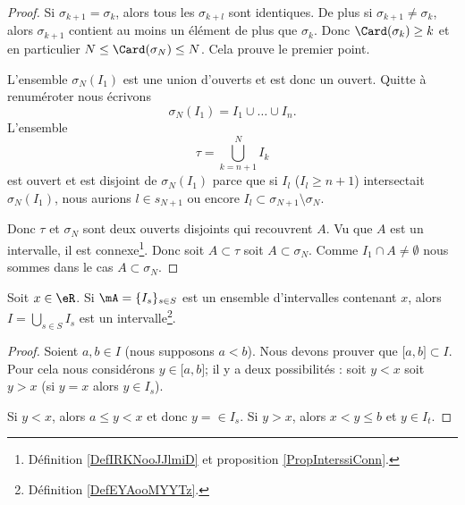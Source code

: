\begin{proof}
    Si \( \sigma_{k+1}=\sigma_k\), alors tous les \( \sigma_{k+l}\) sont identiques. De plus si \( \sigma_{k+1}\neq \sigma_k\), alors \( \sigma_{k+1}\) contient au moins un élément de plus que \( \sigma_k\). Donc \( \Card(\sigma_k)\geq k\) et en particulier \( N\leq \Card(\sigma_N)\leq N\). Cela prouve le premier point.

    L'ensemble \( \sigma_N(I_1)\) est une union d'ouverts et est donc un ouvert. Quitte à renuméroter nous écrivons
    \begin{equation}
        \sigma_N(I_1)=I_1\cup \ldots \cup I_n.
    \end{equation}
    L'ensemble 
    \begin{equation}
        \tau=\bigcup_{k=n+1}^NI_k
    \end{equation}
    est ouvert et est disjoint de \( \sigma_N(I_1)\) parce que si \( I_l\) ($I_l\geq n+1$) intersectait \( \sigma_N(I_1)\), nous aurions \( l\in s_{N+1}\) ou encore \( I_l\subset \sigma_{N+1}\setminus\sigma_N\).

    Donc \( \tau\) et \( \sigma_N\) sont deux ouverts disjoints qui recouvrent \( A\). Vu que \( A\) est un intervalle, il est connexe\footnote{Définition \ref{DefIRKNooJJlmiD} et proposition \ref{PropInterssiConn}.}. Donc soit \( A\subset \tau\) soit \( A\subset \sigma_N\). Comme \( I_1\cap A\neq \emptyset\) nous sommes dans le cas \( A\subset \sigma_N\).
\end{proof}

\begin{lemma}       \label{LEMooGHPTooKgFvGb}
    Soit \( x\in \eR\). Si \( \mA=\{ I_s \}_{s\in S}\) est un ensemble d'intervalles contenant \( x\), alors \( I=\bigcup_{s\in S}I_s\) est un intervalle\footnote{Définition \ref{DefEYAooMYYTz}.}.
\end{lemma}

\begin{proof}
    Soient \( a,b\in I \) (nous supposons \( a<b\)). Nous devons prouver que \( \mathopen[ a , b \mathclose]\subset I\). Pour cela nous considérons \( y\in \mathopen[ a , b \mathclose]\); il y a deux possibilités : soit \( y<x\) soit \( y>x\) (si \( y=x\) alors \( y\in I_s\)). 

    Si \( y<x\), alors \( a\leq y<x\) et donc \( y=\in I_s\). Si \( y>x\), alors \( x<y\leq b\) et \( y\in I_t\).
\end{proof}

